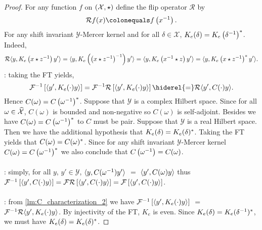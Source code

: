 \begin{proof}
For any function $f$ on $(\mathcal{X},\star)$ define the flip operator $\mathcal{R}$ by
\begin{dmath*}
\mathcal{R}f(x) \colonequals f\left(\inv{x}\right).
\end{dmath*}
For any shift invariant $\mathcal{Y}$-Mercer kernel and for all $\delta\in\mathcal{X}$,  $K_e(\delta)=K_e\left({\delta}^{-1}\right)^*$. Indeed,
\begin{dmath*}
\mathcal{R}\inner{y,K_e\left(x\groupop \inv{z}\right)y'}
=\inner{y,K_e\left(\inv{\left(x\groupop \inv{z}\right)}\right)y'}
=\inner{y,K_e\left(\inv{x}\groupop z\right)y'}
=\inner{y,K_e\left(x\groupop \inv{z}\right)^\adjoint y'}.
\end{dmath*}
: taking the \acl{FT} yields,
\begin{dmath*}
\IFT{\inner{y', K_e(\cdot)y}}=\mathcal{F}^{-1}\mathcal{R}\left[\inner{y', K_e(\cdot)y}\right]
\hiderel{=}\mathcal{R}\inner{y', C(\cdot)y}.
\end{dmath*}
Hence $C(\omega)=C\left({\omega}^{-1}\right)^*$. Suppose that $\mathcal{Y}$ is a complex Hilbert space. Since for all $\omega\in\mathcal{\widehat{X}}$, $C(\omega)$ is bounded and non-negative so $C(\omega)$ is self-adjoint. Besides we have $C(\omega)=C\left({\omega}^{-1}\right)^* $ to $C$ must be pair. Suppose that $\mathcal{Y}$ is a real Hilbert space. Then we have the additional hypothesis that $K_e(\delta)=K_e(\delta)^*$. Taking the \acl{FT} yields that $C(\omega)=C(\omega)^*$. Since for any shift invariant $\mathcal{Y}$-Mercer kernel $C(\omega)=C\left({\omega}^{-1}\right)^*$ we also conclude that $C\left({\omega}^{-1}\right)=C(\omega)$.
\paragraph{}
: simply, for all $y$, $y'\in\mathcal{Y}$, $\langle y, C({\omega}^{-1})y'\rangle$ $=$ $\langle y', C(\omega)y\rangle$ thus $\mathcal{F}^{-1}\left[\langle y', C(\cdot)y\rangle\right]=\mathcal{F}\mathcal{R}\left[\langle y', C(\cdot)y\rangle\right]=\mathcal{F}\left[\langle y', C(\cdot)y\rangle\right]$.
\paragraph{}
: from \cref{lm:C_characterization_2} we have $\mathcal{F}^{-1}\left[\langle y', K_e(\cdot)y\rangle\right]$ $=$ $\mathcal{F}^{-1}\mathcal{R}{\langle y', K_e(\cdot)y\rangle}$. By injectivity of the \acl{FT}, $K_e$ is even. Since $K_e(\delta)=K_e({\delta}^{-1})^* $, we must have $K_e(\delta)=K_e(\delta)^* $.
\end{proof}
